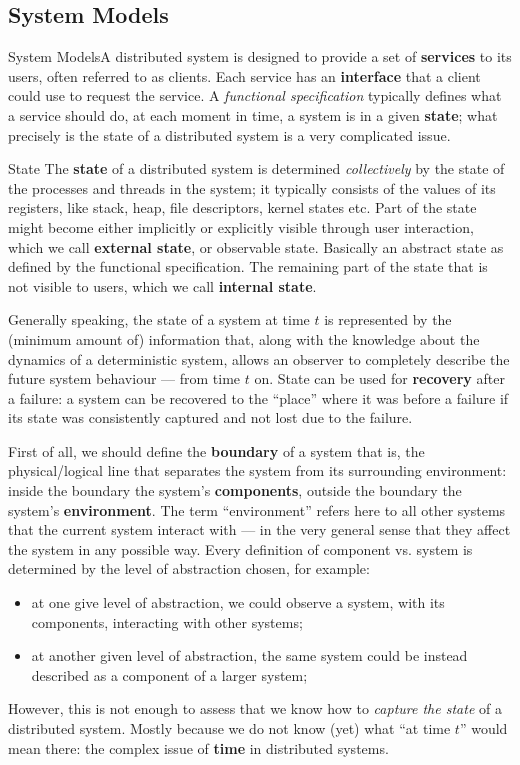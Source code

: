 \documentclass[11pt, a4paper]{article}
\begin{document}
\subsection{System Models}\label{sub:system_models} %
System ModelsA distributed system is designed to provide a set of \textbf{services} to its users, often referred to as clients.
Each service has an \textbf{interface} that a client could use to request the service.
A \textit{functional specification} typically defines what a service should do, at each moment in time, a system is in a given \textbf{state}; what precisely is the state of a distributed system is a very complicated issue.
\begin{definition}{State}{}
    The \textbf{state} of a distributed system is determined \textit{collectively} by the state of the processes and threads in the system; it typically consists of the values of its registers, like stack, heap, file descriptors, kernel states etc.
Part of the state might become either implicitly or explicitly visible through user interaction, which we call \textbf{external state}, or observable state. Basically an abstract state as defined by the functional specification.
The remaining part of the state that is not visible to users, which we call \textbf{internal state}.
\end{definition}
Generally speaking, the state of a system at time $t$ is represented by the (minimum amount of) information that, along with the knowledge about the dynamics of a deterministic system, allows an observer to completely describe the future system behaviour --- from time $t$ on.
State can be used for \textbf{recovery} after a failure: a system can be recovered to the ``place'' where it was before a failure if its state was consistently captured and not lost due to the failure.
\begin{note}
    First of all, we should define the \textbf{boundary} of a system that is, the physical/logical line that separates the system from its surrounding environment: inside the boundary the system's \textbf{components}, outside the boundary the system's \textbf{environment}.
    The term ``environment'' refers here to all other systems that the current system interact with --- in the very general sense that they affect the system in any possible way.
    Every definition of component vs. system is determined by the level of abstraction chosen, for example:
    \begin{itemize}
        \item at one give level of abstraction, we could observe a system, with its components, interacting with other systems;
        \item at another given level of abstraction, the same system could be instead described as a component of a larger system;
    \end{itemize}
\end{note}
However, this is not enough to assess that we know how to \textit{capture the state} of a distributed system. Mostly because we do not know (yet) what ``at time $t$'' would mean there: the complex issue of \textbf{time} in distributed systems.
%
\end{document}
